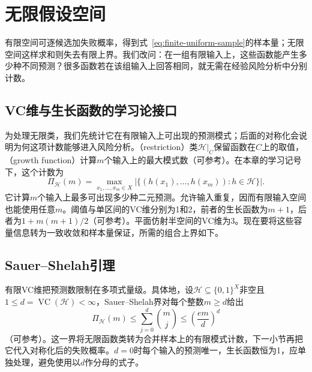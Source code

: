 \section{无限假设空间}
\label{sec:binary-infinite-class}

有限空间可逐候选加失败概率，得到式~\eqref{eq:finite-uniform-sample}的样本量；无限空间这样求和则失去有限上界。我们改问：在一组有限输入上，这些函数能产生多少种不同预测？很多函数若在该组输入上回答相同，就无需在经验风险分析中分别计数。

\subsection{VC维与生长函数的学习论接口}
\label{sec:binary-shattering-vc}

为处理无限类，我们先统计它在有限输入上可出现的预测模式；后面的对称化会说明为何这项计数能够进入风险分析。（restriction）类$\mathcal H|_C$保留函数在$C$上的取值，（growth function）计算$m$个输入上的最大模式数（可参考）。在本章的学习记号下，这个计数为
\begin{equation}
 \Pi_{\mathcal H}(m)
 =\max_{x_1,\ldots,x_m\in X}
   \left|\{(h(x_1),\ldots,h(x_m)):h\in\mathcal H\}\right|.
 \label{eq:learning-growth-function}
\end{equation}
它计算$m$个输入上最多可出现多少种二元预测。允许输入重复，因而有限输入空间也能使用任意$m$。阈值与单区间的VC维分别为1和2，前者的生长函数为$m+1$，后者为$1+m(m+1)/2$（可参考）。平面仿射半空间的VC维为3。现在要将这些容量信息转为一致收敛和样本量保证，所需的组合上界如下。

\subsection{Sauer--Shelah引理}
\label{sec:binary-growth-sauer}

\label{lem:learning-sauer-shelah}
有限VC维把预测数限制在多项式量级。具体地，设$\mathcal H\subseteq\{0,1\}^X$非空且$1\leq d=\operatorname{VC}(\mathcal H)<\infty$，Sauer--Shelah界对每个整数$m\geq d$给出
\begin{equation}
 \Pi_{\mathcal H}(m)
 \leq\sum_{j=0}^{d}\binom{m}{j}
 \leq\left(\frac{em}{d}\right)^d
 \label{eq:learning-sauer-shelah}
\end{equation}
（可参考）。这一界将无限函数类转为合并样本上的有限模式计数，下一小节再把它代入对称化后的失败概率。$d=0$时每个输入的预测唯一，生长函数恒为1，应单独处理，避免使用以$d$作分母的式子。

